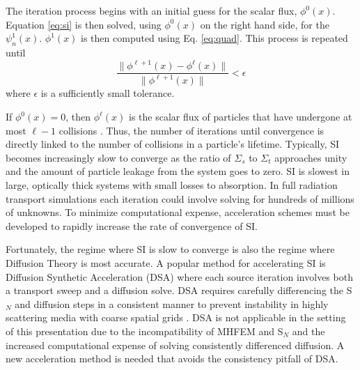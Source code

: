 \documentclass{anstrans}
\newcommand{\SN}{S$_N$\xspace}
\begin{document}
	The iteration process begins with an initial guess for the scalar flux, $\phi^0(x)$. Equation \ref{eq:si} is then solved, using $\phi^0(x)$ on the right hand side, for the $\psi_n^1(x)$. $\phi^1(x)$ is then computed using Eq. \ref{eq:quad}.  
	This process is repeated until 
		\begin{equation} \label{eq:converg}
			\frac{\|\phi^{\ell+1}(x) - \phi^{\ell}(x)\|}{\|\phi^{\ell+1}(x)\|} < \epsilon
		\end{equation}
	where $\epsilon$ is a sufficiently small tolerance. 

	If $\phi^0(x) = 0$, then $\phi^\ell(x)$ is the scalar flux of particles that have undergone at most $\ell - 1$ collisions \cite{adams}. Thus, the number of iterations until convergence is directly linked to the number of collisions in a particle's lifetime. Typically, SI becomes increasingly slow to converge as the ratio of $\Sigma_s$ to $\Sigma_t$ approaches unity and the amount of particle leakage from the system goes to zero. SI is slowest in large, optically thick systems with small losses to absorption. In full radiation transport simulations each iteration could involve solving for hundreds of millions of unknowns. To minimize computational expense, acceleration schemes must be developed to rapidly increase the rate of convergence of SI. 

	Fortunately, the regime where SI is slow to converge is also the regime where Diffusion Theory is most accurate. A popular method for accelerating SI is Diffusion Synthetic Acceleration (DSA) where each source iteration involves both a transport sweep and a diffusion solve. DSA requires carefully differencing the \SN and diffusion steps in a consistent manner to prevent instability in highly scattering media with coarse spatial grids \cite{alcouffe,morel}. DSA is not applicable in the setting of this presentation due to the incompatibility of MHFEM and \SN and the increased computational expense of solving consistently differenced diffusion. A new acceleration method is needed that avoids the consistency pitfall of DSA. 
\end{document}

